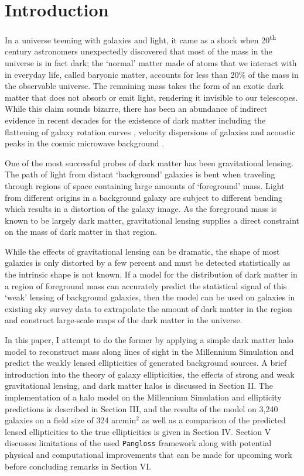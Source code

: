 \documentclass[%
 reprint,
 amsmath,amssymb,
 aps,nofootinbib
]{revtex4-1}
\begin{document}

\section{Introduction}

In a universe teeming with galaxies and light, it came as a shock when 20\textsuperscript{th} century astronomers unexpectedly discovered that most of the mass in the universe is in fact dark; the `normal' matter made of atoms that we interact with in everyday life, called baryonic matter, accounts for less than 20\% of the mass in the observable universe. The remaining mass takes the form of an exotic dark matter that does not absorb or emit light, rendering it invisible to our telescopes. While this claim sounds bizarre, there has been an abundance of indirect evidence in recent decades for the existence of dark matter including the flattening of galaxy rotation curves \cite{rotation_curve}, velocity dispersions of galaxies \cite{zwicky} and acoustic peaks in the cosmic microwave background \cite{planck_2015}.

One of the most successful probes of dark matter has been gravitational lensing. The path of light from distant `background' galaxies is bent when traveling through regions of space containing large amounts of `foreground' mass. Light from different origins in a background galaxy are subject to different bending which results in a distortion of the galaxy image. As the foreground mass is known to be largely dark matter, gravitational lensing supplies a direct constraint on the mass of dark matter in that region.

While the effects of gravitational lensing can be dramatic, the shape of most galaxies is only distorted by a few percent and must be detected statistically as the intrinsic shape is not known. If a model for the distribution of dark matter in a region of foreground mass can accurately predict the statistical signal of this `weak' lensing of background galaxies, then the model can be used on galaxies in existing sky survey data to extrapolate the amount of dark matter in the region and construct large-scale maps of the dark matter in the universe.

In this paper, I attempt to do the former by applying a simple dark matter halo model to reconstruct mass along lines of sight in the Millennium Simulation and predict the weakly lensed ellipticities of generated background sources. A brief introduction into the theory of galaxy ellipticities, the effects of strong and weak gravitational lensing, and dark matter halos is discussed in Section II. The implementation of a halo model on the Millennium Simulation and ellipticity predictions is described in Section III, and the results of the model on 3,240 galaxies on a field size of 324 arcmin$^2$ as well as a comparison of the predicted lensed ellipticities to the true ellipticities is given in Section IV.  Section V discusses limitations of the used \texttt{Pangloss} framework along with potential physical and computational improvements that can be made for upcoming work before concluding remarks in Section VI.
\end{document}
